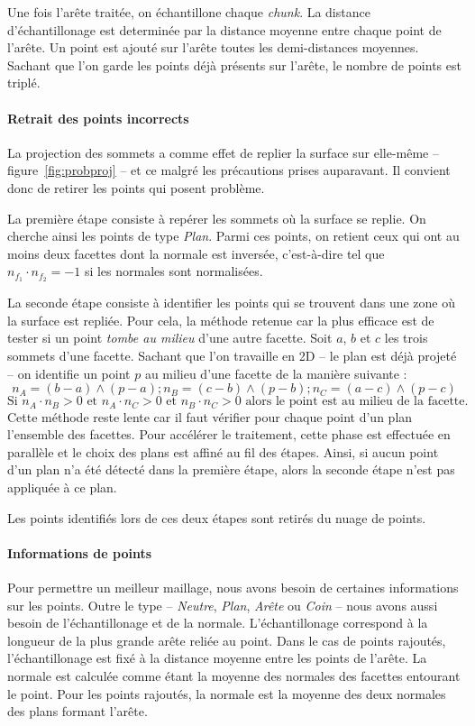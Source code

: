 ﻿\documentclass[12pt, twoside]{article}
\begin{document}
Une fois l'arête traitée, on échantillone chaque \textit{chunk}. La distance d'échantillonage est determinée par la distance moyenne entre chaque point de l'arête. Un point est ajouté sur l'arête toutes les demi-distances moyennes. Sachant que l'on garde les points déjà présents sur l'arête, le nombre de points est triplé.

\paragraph{Retrait des points incorrects} La projection des sommets a comme effet de replier la surface sur elle-même -- figure~\ref{fig:probproj} -- et ce malgré les précautions prises auparavant. Il convient donc de retirer les points qui posent problème.

La première étape consiste à repérer les sommets où la surface se replie. On cherche ainsi les points de type \textit{Plan}. Parmi ces points, on retient ceux qui ont au moins deux facettes dont la normale est inversée, c'est-à-dire tel que $n_{f_{1}} \cdot n_{f_{2}} = -1$ si les normales sont normalisées.

La seconde étape consiste à identifier les points qui se trouvent dans une zone où la surface est repliée. Pour cela, la méthode retenue car la plus efficace est de tester si un point \textit{tombe au milieu} d'une autre facette. Soit $a$, $b$ et $c$ les trois sommets d'une facette. Sachant que l'on travaille en 2D -- le plan est déjà projeté -- on identifie un point $p$ au milieu d'une facette de la manière suivante :
$$n_A = (b-a)\wedge(p-a) ; n_B = (c-b)\wedge(p-b) ; n_C = (a-c)\wedge(p-c)$$
$$\text{Si }n_A\cdot n_B > 0 \text{ et } n_A\cdot n_C > 0 \text{ et } n_B\cdot n_C > 0 \text{ alors le point est au milieu de la facette.}$$
Cette méthode reste lente car il faut vérifier pour chaque point d'un plan l'ensemble des facettes. Pour accélérer le traitement, cette phase est effectuée en parallèle et le choix des plans est affiné au fil des étapes. Ainsi, si aucun point d'un plan n'a été détecté dans la première étape, alors la seconde étape n'est pas appliquée à ce plan.

Les points identifiés lors de ces deux étapes sont retirés du nuage de points.

\paragraph{Informations de points} Pour permettre un meilleur maillage, nous avons besoin de certaines informations sur les points. Outre le type -- \textit{Neutre}, \textit{Plan}, \textit{Arête} ou \textit{Coin} -- nous avons aussi besoin de l'échantillonage et de la normale. L'échantillonage correspond à la longueur de la plus grande arête reliée au point. Dans le cas de points rajoutés, l'échantillonage est fixé à la distance moyenne entre les points de l'arête. La normale est calculée comme étant la moyenne des normales des facettes entourant le point. Pour les points rajoutés, la normale est la moyenne des deux normales des plans formant l'arête.\newline
\end{document}
